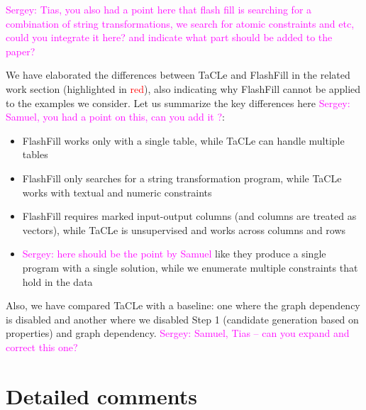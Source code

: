 \documentclass{article}
\newcommand{\sergey}[1]{\textcolor{magenta}{{\sc Sergey:} #1}\xspace}
\begin{document}
\sergey{Tias, you also had a point here that flash fill is searching for a combination of string transformations, we search for atomic constraints and etc, could you integrate it here? and indicate what part should be added to the paper?}

We have elaborated the differences between TaCLe and FlashFill in the related work section (highlighted in \textcolor{red}{red}), also indicating why FlashFill cannot be applied to the examples we consider. Let us summarize the key differences here \sergey{Samuel, you had a point on this, can you add it ?}:
\begin{itemize}
  \item FlashFill works only with a single table, while TaCLe can handle multiple tables
  \item FlashFill only searches for a string transformation program, while TaCLe works with textual and numeric constraints
  \item FlashFill requires marked input-output columns (and columns are treated as vectors), while TaCLe is unsupervised and works across columns and rows
  \item \sergey{here should be the point by Samuel} like they produce a single program with a single solution, while we enumerate multiple constraints that hold in the data
\end{itemize}


Also, we have compared TaCLe with a baseline: one where the graph dependency is disabled and another where we disabled Step 1 (candidate generation based on properties) and graph dependency. \sergey{Samuel, Tias -- can you expand and correct this one?}

\section{Detailed comments}
\end{document}
